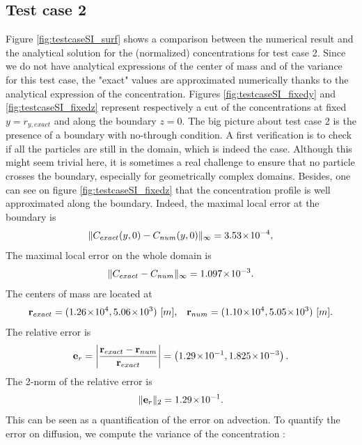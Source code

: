 \subsection{Test case 2}
Figure \ref{fig:testcaseSI_surf} shows a comparison between the numerical result and the analytical solution for the (normalized) concentrations for test case 2. Since we do not have analytical expressions of the center of mass and of the variance for this test case, the "exact" values are approximated numerically thanks to the analytical expression of the concentration. Figures \ref{fig:testcaseSI_fixedy} and \ref{fig:testcaseSI_fixedz} represent respectively a cut of the concentrations at fixed $y = r_{y,exact}$ and along the boundary $z = 0$. The big picture about test case 2 is the presence of a boundary with no-through condition. A first verification is to check if all the particles are still in the domain, which is indeed the case. Although this might seem trivial here, it is sometimes a real challenge to ensure that no particle crosses the boundary, especially for geometrically complex domains. Besides, one can see on figure \ref{fig:testcaseSI_fixedz} that the concentration profile is well approximated along the boundary. Indeed, the maximal local error at the boundary is
\begin{equation}
	\|C_{exact}(y,0)-C_{num}(y,0)\|_{\infty} = 3.53\!\times\!10^{-4}, 
\end{equation}
The maximal local error on the whole domain is 
\begin{equation}
	\|C_{exact}-C_{num}\|_{\infty} = 1.097\!\times\!10^{-3}.
\end{equation}
The centers of mass are located at
\begin{equation}
	\b r_{exact} = (1.26\e{4},5.06\e{3}) \mbox{ [$m$],}\quad \b r_{num} = (1.10\e{4},5.05\e{3}) \mbox{ [$m$]}.
\end{equation}
The relative error is
\begin{equation}
	\mathbf e_r = \left \lvert \frac{\mathbf r_{exact}-\mathbf r_{num}}{\mathbf r_{exact}} \right \rvert =  \left(1.29\!\times\!10^{-1}, 1.825\!\times\!10^{-3}\right).
\end{equation}
The 2-norm of the relative error is
\begin{equation}
	\| \mathbf e_r \|_2 = 1.29\!\times\!10^{-1}.
\end{equation}
This can be seen as a quantification of the error on advection. To quantify the error on diffusion, we compute the variance of the concentration :

